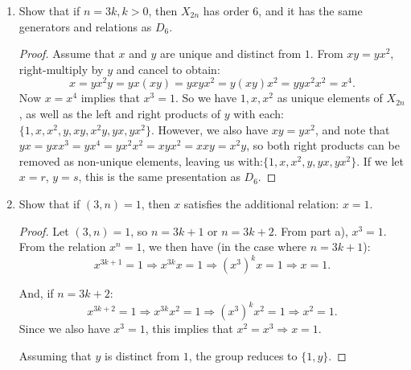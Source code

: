 \documentclass{article}
\begin{document}
\begin{enumerate}[label=(\alph*)]
    \item Show that if $n = 3k, k > 0$, then $X_{2n}$ has order 6, and it has the same generators and relations as $D_6$.
          \begin{proof}
            Assume that $x$ and $y$ are unique and distinct from $1$. From $xy = yx^2$, right-multiply by $y$ and cancel to obtain:
            \begin{equation*}
                x = yx^2y = yx(xy) = yxyx^2 = y(xy)x^2 = yyx^2x^2 = x^4.
            \end{equation*}
            Now $x = x^4$ implies that $x^3 = 1$. So we have $1, x, x^2$ as unique elements of $X_{2n}$, as well as the left and right products of $y$ with each: $\{1, x, x^2, y, xy, x^2y, yx, yx^2\}$. However, we also have $xy = yx^2$, and note that $yx = yx x^3 = yx^4 = yx^2 x^2 = xy x^2 = xxy = x^2 y$, so both right products can be removed as non-unique elements, leaving us with:\newline $\{1, x, x^2, y, yx, yx^2\}$. If we let $x = r$, $y = s$, this is the same presentation as $D_6$.
          \end{proof}
    \item Show that if $(3, n) = 1$, then $x$ satisfies the additional relation: $x = 1$.
          \begin{proof}
            Let $(3, n) = 1$, so $n = 3k + 1$ or $n = 3k + 2$. From part a), $x^3 = 1$. From the relation $x^n = 1$, we then have (in the case where $n = 3k + 1$):
            \begin{equation*}
                x^{3k + 1} = 1 \Rightarrow x^{3k} x = 1 \Rightarrow (x^3)^k x = 1 \Rightarrow x = 1.
            \end{equation*}

            And, if $n = 3k + 2$:
            \begin{equation*}
                x^{3k + 2} = 1 \Rightarrow x^{3k} x^2 = 1 \Rightarrow (x^3)^k x^2 = 1 \Rightarrow x^2 = 1.
            \end{equation*}
            Since we also have $x^3 = 1$, this implies that $x^2 = x^3 \Rightarrow x = 1$.

            Assuming that $y$ is distinct from $1$, the group reduces to $\{1, y\}$.
          \end{proof}
\end{enumerate}
\end{document}
